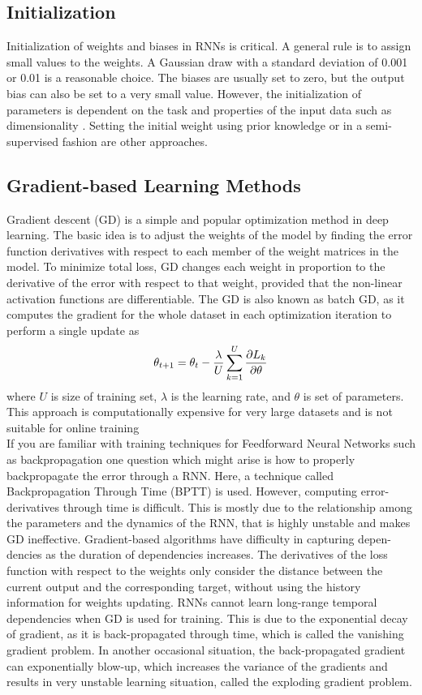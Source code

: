 \documentclass{article}
\begin{document}
\subsection{Initialization}
Initialization of weights and biases in RNNs is critical.
A general rule is to assign small values to the weights. A
Gaussian draw with a standard deviation of 0.001 or 0.01 is a
reasonable choice. The biases are usually set to zero,
but the output bias can also be set to a very small value.
However, the initialization of parameters is dependent on the
task and properties of the input data such as dimensionality .
Setting the initial weight using prior knowledge or in a semi-supervised fashion are other approaches.
\subsection{Gradient-based Learning Methods}
Gradient descent (GD) is a simple and popular optimization
method in deep learning. The basic idea is to adjust the
weights of the model by finding the error function derivatives
with respect to each member of the weight matrices in the
model. To minimize total loss, GD changes each weight
in proportion to the derivative of the error with respect to
that weight, provided that the non-linear activation functions
are differentiable. The GD is also known as batch GD,
as it computes the gradient for the whole dataset in each
optimization iteration to perform a single update as
\begin{equation}
  \theta_{t+1} = \theta_t - \frac{\lambda}{U}\sum_{k=1}^U \pdv{L_k}{\theta}
\end{equation}
where $U$ is size of training set, $\lambda$ is the learning rate, and $\theta$ is
set of parameters. This approach is computationally expensive
for very large datasets and is not suitable for online training \\

If you are familiar with training techniques for Feedforward Neural Networks such as backpropagation
one question which might arise is how to properly backpropagate the error through a RNN. Here, a
technique called Backpropagation Through Time (BPTT) is used. However, computing
error-derivatives through time is difficult. This is mostly
due to the relationship among the parameters and the dynamics
of the RNN, that is highly unstable and makes GD ineffective.
Gradient-based algorithms have difficulty in capturing depen-
dencies as the duration of dependencies increases. The
derivatives of the loss function with respect to the weights
only consider the distance between the current output and the
corresponding target, without using the history information for
weights updating. RNNs cannot learn long-range temporal dependencies when GD is used for training. This is due
to the exponential decay of gradient, as it is back-propagated
through time, which is called the vanishing gradient problem.
In another occasional situation, the back-propagated gradient
can exponentially blow-up, which increases the variance of
the gradients and results in very unstable learning situation,
called the exploding gradient problem.
\end{document}
